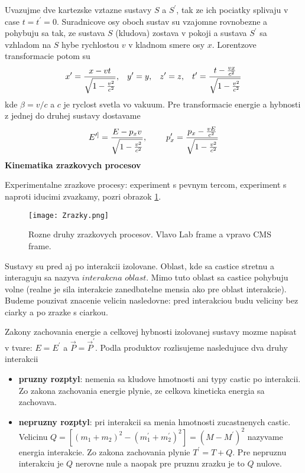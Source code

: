 \documentclass[../../main.tex]{subfiles}
\begin{document}
Uvazujme dve kartezske vztazne sustavy $S$ a $S^{\prime}$, tak ze ich pociatky splivaju v case $t=t^{\prime}=0$. Suradnicove osy oboch sustav su vzajomne rovnobezne a pohybuju sa tak, ze sustava $S$ (kludova) zostava v pokoji a sustava $S^{\prime}$ sa vzhladom na $S$ hybe rychlostou $v$ v kladnom smere osy $x$. Lorentzove transformacie potom su 
\begin{equation} 
x^{\prime}=\frac{x-vt}{\sqrt{1-\frac{v^2}{c^2}}},\hspace{0.3cm} y^{\prime}=y,\hspace{0.3cm} z^{\prime}=z,\hspace{0.3cm} t^{\prime}=\frac{t-\frac{vx}{c^2}}{\sqrt{1-\frac{v^2}{c^2}}} 
\end{equation}
kde $\beta=v/c$ a $c$ je ryclost svetla vo vakuum. Pre transformacie energie a hybnosti z jednej do druhej sustavy dostavame 
\begin{equation}
E^{\prime]}=\frac{E-p_xv}{\sqrt{1-\frac{v^2}{c^2}}}, \hspace{0.8cm} p_x^{\prime}=\frac{p_x-\frac{vE}{c^2}}{\sqrt{1-\frac{v^2}{c^2}}}
\end{equation}\newline
\textbf{Kinematika zrazkovych procesov}\par
Experimentalne zrazkove procesy: experiment s pevnym tercom, experiment s naproti iducimi zvazkamy, pozri obrazok \ref{sf1:fig:Zrazky}.
\begin{figure}[!h]
\centering
\texttt{[image: Zrazky.png]}
\caption{Rozne druhy zrazkovych procesov. Vlavo Lab frame a vpravo CMS frame.}
\label{sf1:fig:Zrazky}
\end{figure}
Sustavy su pred aj po interakcii izolovane. Oblast, kde sa castice stretnu a interaguju sa nazyva $interakcna$ $oblast$. Mimo tuto oblast sa castice pohybuju volne (realne je sila interakcie zanedbatelne mensia ako pre oblast interakcie). Budeme pouzivat znacenie velicin nasledovne: pred interakciou budu veliciny bez ciarky a po zrazke s ciarkou.\par
Zakony zachovania energie a celkovej hybnosti izolovanej sustavy mozme napisat v tvare: $E=E^{\prime}$ a $\vec{P}=\vec{P}^{\prime}$. Podla produktov rozlisujeme nasledujuce dva druhy interakcii
\begin{itemize}
	\item \textbf{pruzny rozptyl}: nemenia sa kludove hmotnosti ani typy castic po interakcii. Zo zakona zachovania energie plynie, ze celkova kineticka energia sa zachovava.
	\item \textbf{nepruzny rozptyl}: pri interakcii sa menia hmotnosti zucastnenych castic. Velicinu $Q=[(m_1+m_2)^2-(m_1^{\prime}+m_2^{\prime})^2]=(M-M^{\prime})^2$ nazyvame energia interakcie. Zo zakona zachovania plynie $T^{\prime}=T+Q$. Pre nepruznu interakciu je $Q$ nerovne nule a naopak pre pruznu zrazku je to $Q$ nulove. 
\end{itemize}
\end{document}
